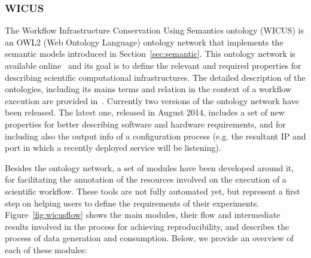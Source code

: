 \subsubsection{WICUS}

The Workflow Infrastructure Conservation Using Semantics ontology 
(WICUS) is an OWL2 (Web Ontology Language) ontology network that 
implements the semantic models introduced in Section~\ref{sec:semantic}. This ontology 
network is available online~\cite{wicus-online} and its goal is to define the relevant and 
required properties for describing scientific computational infrastructures. 
The detailed description of the ontologies, including its mains terms and relation
in the context of a workflow execution are provided in~\cite{wicus}.
Currently two versions of the ontology network have been released. The latest one, released in
August 2014,  includes a set of new properties for better describing software and hardware requirements, and for
including also the output info of a configuration process (e.g. the resultant IP and port in 
which a recently deployed service will be listening).


Besides the ontology network, a set of modules have been developed around it, 
for facilitating the annotation of the resources involved on the execution of a scientific workflow. 
These tools are not fully automated yet, but represent a first step on helping users to define the requirements of their 
experiments. Figure~\ref{fig:wicusflow} shows the main modules, their flow and intermediate 
results involved in the process for achieving reproducibility, and describes the process of 
data generation and consumption. Below, we provide an overview of each of these modules:

